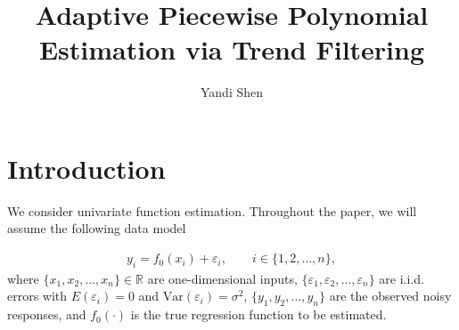 \documentclass[a4paper]{article}
\title{Adaptive Piecewise Polynomial Estimation via Trend Filtering}
\author{Yandi Shen}
\newcommand{\RR}{\mathbb{R}}
\begin{document}
\maketitle


\section{Introduction}
\label{sec:intro}
We consider univariate function estimation. Throughout the paper, we will assume the following data model

\begin{align}
y_i = f_0(x_i) + \varepsilon_i, \qquad i\in\{1, 2, \ldots, n\}, \label{eq:nonpara_model}
\end{align}
where $\{x_1, x_2, \ldots, x_n\}\in\RR$ are one-dimensional inputs, $\{\varepsilon_1, \varepsilon_2, \ldots, \varepsilon_n\}$ are i.i.d. errors with $E(\varepsilon_i) = 0$ and $\mbox{Var}(\varepsilon_i) = \sigma^2$, $\{y_1, y_2, \ldots, y_n\}$ are the observed noisy responses, and $f_0(\cdot)$ is the true regression function to be estimated. 
\end{document}
